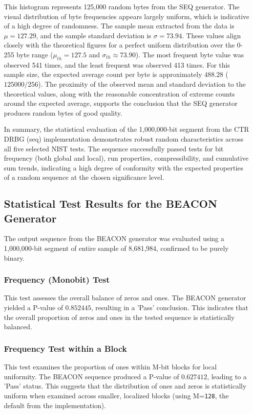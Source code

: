 This histogram represents 125,000 random bytes from the SEQ generator. The visual distribution of byte frequencies appears largely uniform, which is indicative of a high degree of randomness. The sample mean extracted from the data is $\mu = 127.29$, and the sample standard deviation is $\sigma = 73.94$. These values align closely with the theoretical figures for a perfect uniform distribution over the 0-255 byte range ($\mu_{th} = 127.5$ and $\sigma_{th} \approx 73.90$). The most frequent byte value was observed 541 times, and the least frequent was observed 413 times. For this sample size, the expected average count per byte is approximately $488.28$ ($125000 / 256$). The proximity of the observed mean and standard deviation to the theoretical values, along with the reasonable concentration of extreme counts around the expected average, supports the conclusion that the SEQ generator produces random bytes of good quality.

\noindent 

In summary, the statistical evaluation of the 1,000,000-bit segment from the CTR DRBG (seq) implementation demonstrates robust random characteristics across all five selected NIST tests. The sequence successfully passed tests for bit frequency (both global and local), run properties, compressibility, and cumulative sum trends, indicating a high degree of conformity with the expected properties of a random sequence at the chosen significance level.

\subsection{Statistical Test Results for the BEACON Generator} %

The output sequence from the BEACON generator was evaluated using a 1,000,000-bit segment of entire sample of 8,681,984, confirmed to be purely binary. 

\subsubsection{\textbf{Frequency (Monobit) Test}}
This test assesses the overall balance of zeros and ones. The BEACON generator yielded a P-value of $0.852445$, resulting in a 'Pass' conclusion. This indicates that the overall proportion of zeros and ones in the tested sequence is statistically balanced.

\subsubsection{\textbf{Frequency Test within a Block}}
This test examines the proportion of ones within M-bit blocks for local uniformity. The BEACON sequence produced a P-value of $0.627412$, leading to a 'Pass' status. This suggests that the distribution of ones and zeros is statistically uniform when examined across smaller, localized blocks (using M=\texttt{128}, the default from the implementation).

